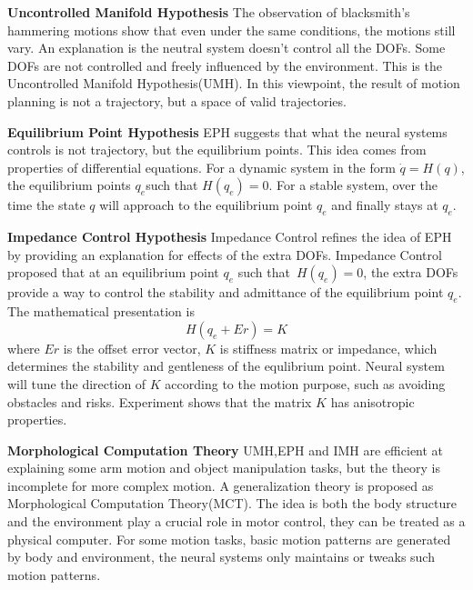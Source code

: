 \textbf{Uncontrolled Manifold Hypothesis}
The observation of blacksmith's hammering motions show that even under the same conditions, the motions still vary. 
An explanation is the neutral system doesn't control all the DOFs. 
Some DOFs are not controlled and freely influenced by the environment. 
This is the Uncontrolled Manifold Hypothesis(UMH)\citep{latash2008neurophysiological}. 
In this viewpoint, the result of motion planning is not a trajectory, but a space of valid trajectories.

\textbf{Equilibrium Point Hypothesis}
EPH suggests that what the neural systems controls is not trajectory, but the equilibrium points.
This idea comes from properties of differential equations. 
For a dynamic system in the form $\dot{q}=H(q)$,
the equilibrium points $q_{e}$such that $H(q_{e})=0$.
For a stable system, over the time the state $q$ will approach to the equilibrium point $q_{e}$ and finally stays at $q_{e}$.


\textbf{Impedance Control Hypothesis}
Impedance Control \citep{hogan1985ica} refines the idea of EPH by providing an explanation for effects of the extra DOFs. 
Impedance Control proposed that at an equilibrium point $q_{e}$ such that~$H(q_{e})=0$,
the extra DOFs provide a way to control the stability and admittance of the equilibrium point $q_{e}$. 
The mathematical presentation is
\begin{equation}
H(q_{e}+Er)=K
\end{equation}
where $Er$ is the offset error vector, $K$ is stiffness matrix or impedance, which determines the stability and gentleness of the equlibrium point.
Neural system will tune the direction of $K$ according to the motion purpose, such as avoiding obstacles and risks. 
Experiment \citep{Franklin2007} shows that the matrix $K$ has anisotropic properties.

\textbf{Morphological Computation Theory}
UMH,EPH and IMH are efficient at explaining some arm motion and object manipulation tasks, but the theory is incomplete for more complex motion.
A generalization theory is proposed as Morphological Computation Theory(MCT)\citep{nishikawa2007neuromechanics,Pfeifer2005}.
The idea is both the body structure and the environment play a crucial role in  motor control, 
they can be treated as a physical computer. 
For some motion tasks, basic motion patterns are generated by body and environment,
the neural systems only  maintains or tweaks such motion patterns.
